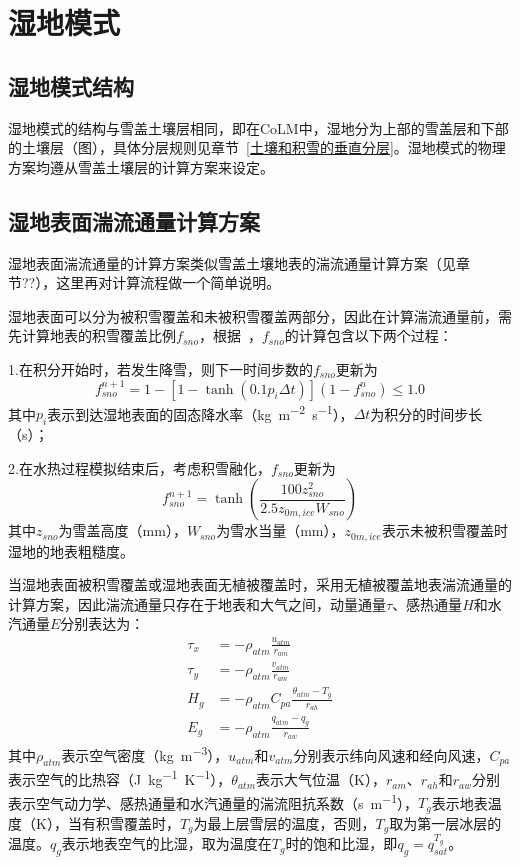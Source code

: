 \chapter{湿地模式}


\section{湿地模式结构}
湿地模式的结构与雪盖土壤层相同，即在CoLM中，湿地分为上部的雪盖层和下部的土壤层（图），具体分层规则见章节~\ref{土壤和积雪的垂直分层}。湿地模式的物理方案均遵从雪盖土壤层的计算方案来设定。

\section{湿地表面湍流通量计算方案}
湿地表面湍流通量的计算方案类似雪盖土壤地表的湍流通量计算方案（见章节??），这里再对计算流程做一个简单说明。

湿地表面可以分为被积雪覆盖和未被积雪覆盖两部分，因此在计算湍流通量前，需先计算地表的积雪覆盖比例$f_{sno}$，根据~\citet{swenson2012new}，$f_{sno}$的计算包含以下两个过程：

1.在积分开始时，若发生降雪，则下一时间步数的$f_{sno}$更新为
\begin{equation}
    f^{n+1}_{sno}=1-\left[1-\tanh{\left(0.1 p_i \Delta t\right)}\right]\left(1-f^n_{sno}\right) \leqslant 1.0
\end{equation}
其中$p_i$表示到达湿地表面的固态降水率（\unit{kg.m^{-2}.s^{-1}}），$\Delta t$为积分的时间步长（s）；

2.在水热过程模拟结束后，考虑积雪融化，$f_{sno}$更新为
\begin{equation}
    f^{n+1}_{sno}=\tanh \left(\frac{100 z^2_{sno}}{2.5z_{0m,ice} W_{sno}}\right)
\end{equation}
其中$z_{sno}$为雪盖高度（mm），$W_{sno}$为雪水当量（mm），$z_{0m,ice}$表示未被积雪覆盖时湿地的地表粗糙度。


当湿地表面被积雪覆盖或湿地表面无植被覆盖时，采用无植被覆盖地表湍流通量的计算方案，因此湍流通量只存在于地表和大气之间，动量通量$\tau$、感热通量$H$和水汽通量$E$分别表达为：
\begin{align}
    \tau_x &= -\rho_{atm} \frac{u_{atm}}{r_{am}} \\
    \tau_y &= -\rho_{atm} \frac{v_{atm}}{r_{am}} \\
    H_g &= -\rho_{atm} C_{pa} \frac{\theta_{atm}-T_g}{r_{ah}} \\
    E_g &= -\rho_{atm} \frac{q_{atm}-q_g}{r_{aw}}
\end{align}
其中$\rho_{atm}$表示空气密度（\unit{kg.m^{-3}}），$u_{atm}$和$v_{atm}$分别表示纬向风速和经向风速，$C_{pa}$表示空气的比热容（\unit{J.kg^{-1}.K^{-1}}），$\theta_{atm}$表示大气位温（K），$r_{am}$、$r_{ah}$和$r_{aw}$分别表示空气动力学、感热通量和水汽通量的湍流阻抗系数（\unit{s.m^{-1}}），$T_g$表示地表温度（K），当有积雪覆盖时，$T_g$为最上层雪层的温度，否则，$T_g$取为第一层冰层的温度。$q_g$表示地表空气的比湿，取为温度在$T_g$时的饱和比湿，即$q_g=q^{T_g}_{sat}$。 

